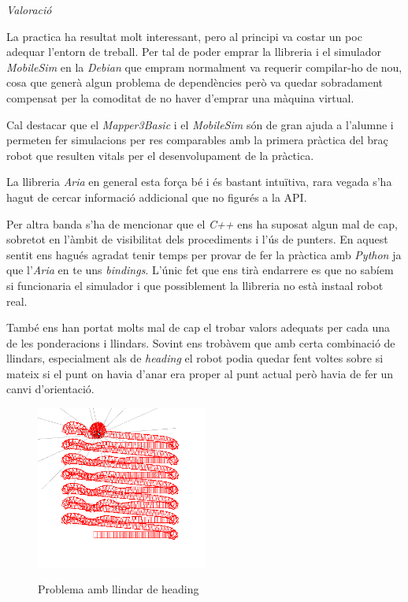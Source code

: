 \emph{Valoració}

La practica ha resultat molt interessant, pero al principi va costar un poc
adequar l'entorn de treball. Per tal de poder emprar la llibreria i el simulador
\emph{MobileSim} en la \emph{Debian} que empram normalment
va requerir compilar-ho de nou, cosa que generà algun problema de dependències
però va quedar sobradament compensat per la comoditat de no haver d'emprar una
màquina virtual.

Cal destacar que el \emph{Mapper3Basic} i el \emph{MobileSim} són de gran ajuda 
a l'alumne i permeten fer simulacions per res comparables amb la primera
pràctica del braç robot que resulten vitals per el desenvolupament de la
pràctica.

La llibreria \emph{Aria} en general esta força bé i és bastant intuïtiva, rara 
vegada s'ha hagut de cercar informació addicional que no figurés a la API.

Per altra banda s'ha de mencionar que el \emph{C++} ens ha suposat algun mal de 
cap, sobretot en l'àmbit de visibilitat dels procediments i l'ús de punters. En
aquest sentit ens hagués agradat tenir temps per provar de fer la pràctica amb
\emph{Python} ja que l'\emph{Aria} en te uns \emph{bindings}. L'únic fet que ens
tirà endarrere es que no sabíem si funcionaria el simulador i que possiblement
la llibreria no està insta\lgem al robot real.

També ens han portat molts mal de cap el trobar valors adequats per cada una de 
les ponderacions i llindars. Sovint ens trobàvem que amb certa combinació de
llindars, especialment als de \emph{heading} el robot podia quedar fent voltes
sobre si mateix si el punt on havia d'anar era proper al punt actual però havia
de fer un canvi d'orientació. 

\begin{figure}[H]
\begin{center}\label{headingthproblem}
 \includegraphics[width=0.5\textwidth]{diagrames/figures/voltes.png}
\end{center}
  \caption{Problema amb llindar de heading}
\end{figure}

